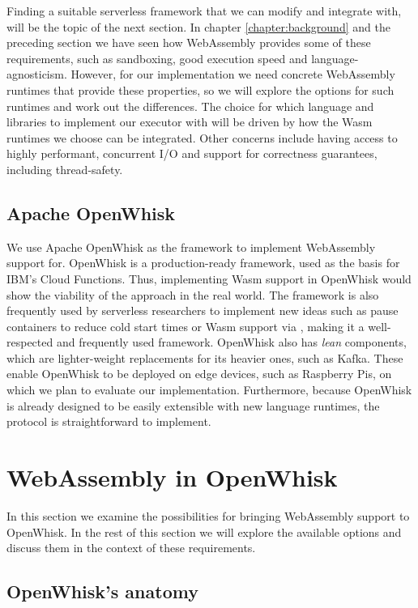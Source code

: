 Finding a suitable serverless framework that we can modify and integrate with, will be the topic of the next section. In chapter \ref{chapter:background} and the preceding section we have seen how WebAssembly provides some of these requirements, such as sandboxing, good execution speed and language-agnosticism. However, for our implementation we need concrete WebAssembly runtimes that provide these properties, so we will explore the options for such runtimes and work out the differences. The choice for which language and libraries to implement our executor with will be driven by how the Wasm runtimes we choose can be integrated. Other concerns include having access to highly performant, concurrent I/O and support for correctness guarantees, including thread-safety.

\subsection{Apache OpenWhisk}

We use Apache OpenWhisk as the framework to implement WebAssembly support for. OpenWhisk is a production-ready framework, used as the basis for IBM's Cloud Functions. Thus, implementing Wasm support in OpenWhisk would show the viability of the approach in the real world. The framework is also frequently used by serverless researchers to implement new ideas such as pause containers to reduce cold start times \cite{Mohan2019} or Wasm support via  \cite{Hall2019}, making it a well-respected and frequently used framework. OpenWhisk also has \emph{lean} components, which are lighter-weight replacements for its heavier ones, such as Kafka. These enable OpenWhisk to be deployed on edge devices, such as Raspberry Pis, on which we plan to evaluate our implementation. Furthermore, because OpenWhisk is already designed to be easily extensible with new language runtimes, the protocol is straightforward to implement.



\section{WebAssembly in OpenWhisk}

In this section we examine the possibilities for bringing WebAssembly support to OpenWhisk.
In the rest of this section we will explore the available options and discuss them in the context of these requirements.

\subsection{OpenWhisk's anatomy}

